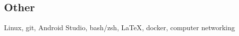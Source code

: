 \documentclass[../Resume.tex]{subfiles}
\begin{document}
    \subsection{Other}
    Linux, git, Android Studio, bash/zsh, {\LaTeX}, docker, computer networking
    \vspace*{-4mm}
\end{document}
